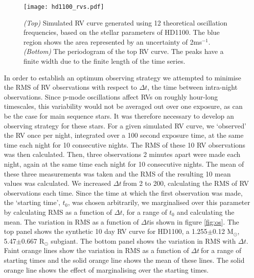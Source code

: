\documentclass[useAMS, usenatbib]{aastex}
\newcommand{\dt}{$\Delta t$}
\begin{document}
\begin{figure*}
\begin{center}
\texttt{[image: hd1100\_rvs.pdf]}
\caption{{\it (Top)} Simulated RV curve generated using 12
theoretical oscillation frequencies, based on the stellar parameters of HD1100.
The blue region shows the area represented by an uncertainty of 2ms$^{-1}$.
{\it (Bottom)} The periodogram of the top RV curve. The peaks have a finite
width due to the finite length of the time series.}
\label{fig:hd1100_rvs}
\end{center}
\end{figure*}


In order to establish an optimum observing strategy we attempted to minimise
the RMS of RV observations with respect to \dt, the time between
intra-night observations.
Since p-mode oscillations affect RVs on roughly hour-long timescales, this
variability would not be averaged out over one exposure, as can be the case for
main sequence stars.
It was therefore necessary to develop an observing strategy for these stars.
For a given simulated RV curve, we `observed' the RV once per night, integrated
over a 100 second exposure time, at the same time each night for 10 consecutive
nights.
The RMS of these 10 RV observations was then calculated.
Then, three observations 2 minutes apart were made each night, again at the
same time each night for 10 consecutive nights.
The mean of these three measurements was taken and the RMS of the
resulting 10 mean values was calculated.
We increased \dt$~$from 2 to 200, calculating the RMS of RV observations
each time.
Since the time at which the first observation was made, the `starting time',
$t_0$, was chosen arbitrarily, we marginalised over this parameter by
calculating RMS as a function of \dt, for a range of $t_0$ and calculating the
mean.
The variation in RMS as a function of \dt is shown in figure
\ref{fig:os}.
The top panel shows the synthetic 10 day RV curve for HD1100, a 1.255$\pm$0.12
M$_\odot$, 5.47$\pm$0.667 R$_\odot$ subgiant.
The bottom panel shows the variation in RMS with \dt.
Faint orange lines show the variation in RMS as a function of \dt$~$for a range
of starting times and the solid orange line shows the mean of these lines.
The solid orange line shows the effect of marginalising over the starting
times.
\end{document}
